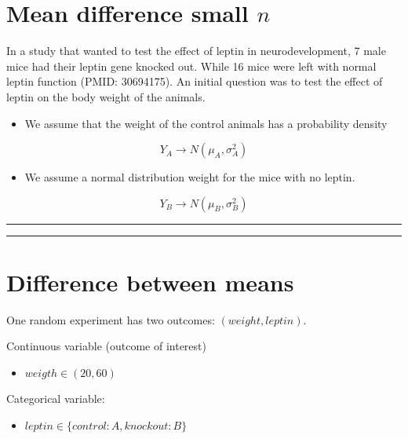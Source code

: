 \documentclass[
]{book}
\providecommand{\tightlist}{%
  \setlength{\itemsep}{0pt}\setlength{\parskip}{0pt}}
\begin{document}
\hypertarget{mean-difference-small-n-1}{%
\section{\texorpdfstring{Mean difference small \(n\)}{Mean difference small n}}\label{mean-difference-small-n-1}}

In a study that wanted to test the effect of leptin in neurodevelopment, 7 male mice had their leptin gene knocked out. While 16 mice were left with normal leptin function (PMID: 30694175). An initial question was to test the effect of leptin on the body weight of the animals.

\begin{itemize}
\tightlist
\item
  We assume that the weight of the control animals has a probability density
\end{itemize}

\[Y_A \rightarrow N(\mu_A, \sigma_A^2)\]

\begin{itemize}
\tightlist
\item
  We assume a normal distribution weight for the mice with no leptin.
\end{itemize}

\[Y_B \rightarrow N(\mu_B, \sigma_B^2)\]

\begin{center}\rule{0.5\linewidth}{0.5pt}\end{center}

\begin{center}\rule{0.5\linewidth}{0.5pt}\end{center}

\hypertarget{difference-between-means-5}{%
\section{Difference between means}\label{difference-between-means-5}}

One random experiment has two outcomes: \((weight, leptin)\).

Continuous variable (outcome of interest)

\begin{itemize}
\tightlist
\item
  \(weigth \in (20, 60)\)
\end{itemize}

Categorical variable:

\begin{itemize}
\tightlist
\item
  \(leptin \in \{control:A,knockout:B\}\)
\end{itemize}
\end{document}

